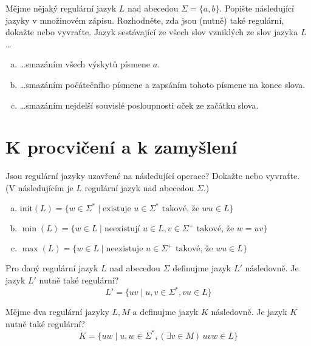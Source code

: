 \documentclass[a4paper,12pt]{amsart}
\begin{document}
\begin{problem}[Mazání]

    Mějme nějaký regulární jazyk $L$ nad abecedou $\Sigma=\{a,b\}$. Popište následující jazyky v množinovém zápisu. Rozhodněte, zda jsou (nutně) také regulární, dokažte nebo vyvraťte. Jazyk sestávající ze všech slov vzniklých ze slov jazyka $L$\dots
    
    \medskip
    \begin{enumerate}[(a)]\setlength\itemsep{12pt}
            \item \dots smazáním všech výskytů písmene $a$.
            \item \dots smazáním počátečního písmene a zapsáním tohoto písmene na konec slova.
            \item \dots smazáním nejdelší souvislé posloupnosti $a$ček ze začátku slova.
    \end{enumerate}

\end{problem}


\section*{K procvičení a k zamyšlení}


\medskip\medskip\begin{problem}[Prefixy]
    Jsou regulární jazyky uzavřené na následující operace? Dokažte nebo vyvraťte. (V následujícím je $L$ regulární jazyk nad abecedou $\Sigma$.)
    \begin{enumerate}[(a)]
        \item $\mathrm{init}(L)=\{w\in\Sigma^*\mid \text{existuje }u\in\Sigma^*\text{ takové, že }wu\in L\}$
        \item $\min(L)=\{w\in L\mid \text{neexistují }u\in L,v\in\Sigma^+\text{ takové, že }w=uv\}$
        \item $\max(L)=\{w\in L\mid \text{neexistuje }u\in\Sigma^+\text{ takové, že }wu\in L\}$
    \end{enumerate}
\end{problem}


\medskip\begin{problem}[Posun]
    Pro daný regulární jazyk $L$ nad abecedou $\Sigma$ definujme jazyk $L'$ následovně. Je jazyk $L'$ nutně také regulární?
    $$
    L'=\{uv\mid u,v\in\Sigma^*,vu\in L\}
    $$
\end{problem}


\medskip\begin{problem}[Řez]
    Mějme dva regulární jazyky $L,M$ a definujme jazyk $K$ následovně. Je jazyk $K$ nutně také regulární?
    $$
    K=\{uw\mid u,w\in\Sigma^*, (\exists v\in M)\, uvw\in L\}
    $$    
\end{problem}
    
\end{document}

